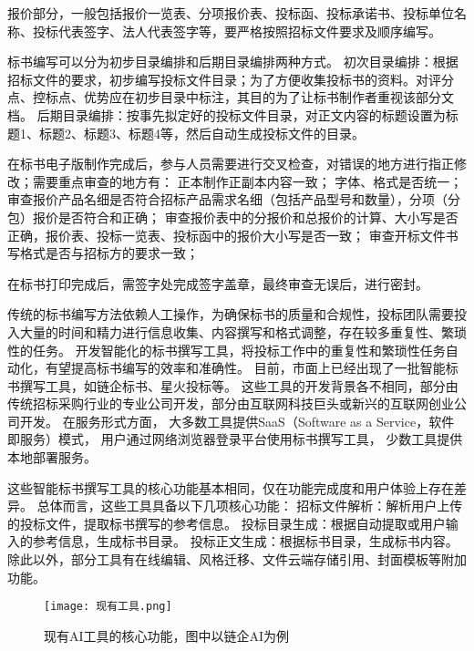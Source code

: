 \documentclass{xmu}
\begin{document}
报价部分，一般包括报价一览表、分项报价表、投标函、投标承诺书、投标单位名称、投标代表签字、法人代表签字等，要严格按照招标文件要求及顺序编写。

标书编写可以分为初步目录编排和后期目录编排两种方式。
初次目录编排：根据招标文件的要求，初步编写投标文件目录；为了方便收集投标书的资料。对评分点、控标点、优势应在初步目录中标注，其目的为了让标书制作者重视该部分文档。
后期目录编排：按事先拟定好的投标文件目录，对正文内容的标题设置为标题1、标题2、标题3、标题4等，然后自动生成投标文件的目录。

在标书电子版制作完成后，参与人员需要进行交叉检查，对错误的地方进行指正修改；需要重点审查的地方有：
正本制作正副本内容一致；
字体、格式是否统一；
审查报价产品名细是否符合招标产品需求名细（包括产品型号和数量），分项（分包）报价是否符合和正确；
审查报价表中的分报价和总报价的计算、大小写是否正确，报价表、投标一览表、投标函中的报价大小写是否一致；
审查开标文件书写格式是否与招标方的要求一致；

在标书打印完成后，需签字处完成签字盖章，最终审查无误后，进行密封。

传统的标书编写方法依赖人工操作，为确保标书的质量和合规性，投标团队需要投入大量的时间和精力进行信息收集、内容撰写和格式调整，存在较多重复性、繁琐性的任务。
开发智能化的标书撰写工具，将投标工作中的重复性和繁琐性任务自动化，有望提高标书编写的效率和准确性。
目前，市面上已经出现了一批智能标书撰写工具，如链企标书、星火投标等。
这些工具的开发背景各不相同，部分由传统招标采购行业的专业公司开发，部分由互联网科技巨头或新兴的互联网创业公司开发。
在服务形式方面，
大多数工具提供SaaS（Software as a Service，软件即服务）模式，
用户通过网络浏览器登录平台使用标书撰写工具，
少数工具提供本地部署服务。

这些智能标书撰写工具的核心功能基本相同，仅在功能完成度和用户体验上存在差异。
总体而言，这些工具具备以下几项核心功能：
招标文件解析：解析用户上传的投标文件，提取标书撰写的参考信息。
投标目录生成：根据自动提取或用户输入的参考信息，生成标书目录。
投标正文生成：根据标书目录，生成标书内容。
除此以外，部分工具有在线编辑、风格迁移、文件云端存储引用、封面模板等附加功能。

\begin{figure}[!htb]
    \centering
    \texttt{[image: 现有工具.png]}\\
    \caption{现有AI工具的核心功能，图中以链企AI为例}\label{xmulogo}
\end{figure}
\end{document}
